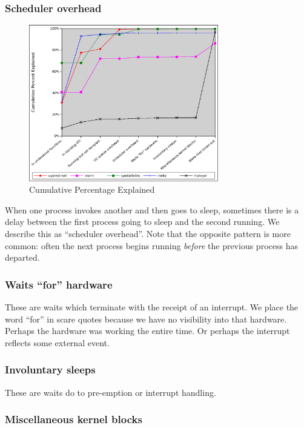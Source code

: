 \documentclass[10pt]{article}
\begin{document}
\subsubsection{Scheduler overhead}
\begin{figure}[b!]
\includegraphics[width=3.25in]{5cumugraph}
\caption{Cumulative Percentage Explained}
\label{fig:resgraph}
\end{figure}

When one process invokes another and then goes to sleep, sometimes there is a delay between the first process going to sleep and the second running.  We describe this as ``scheduler overhead''.  Note that the opposite pattern is more common: often the next process begins running \emph{before} the previous process has departed.

\subsubsection{Waits ``for'' hardware}

These are waits which terminate with the receipt of an interrupt.  We place the word ``for'' in scare quotes because we have no visibility into that hardware.  Perhaps the hardware was working the entire time.  Or perhaps the interrupt reflects some external event.

\subsubsection{Involuntary sleeps}

These are waits do to pre-emption or interrupt handling.

\subsubsection{Miscellaneous kernel blocks}
\end{document}
